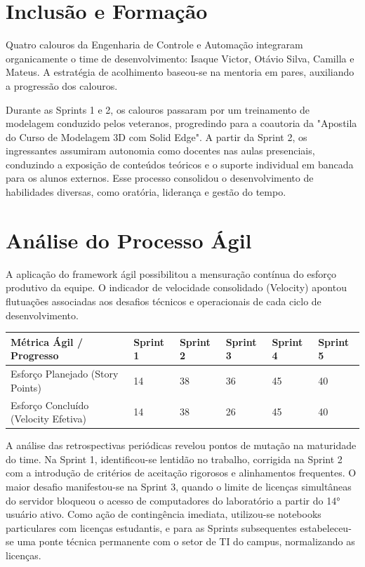 \documentclass[12pt,a4paper]{article}
\begin{document}
\section{Inclusão e Formação}
Quatro calouros da Engenharia de Controle e Automação integraram organicamente o time de desenvolvimento: Isaque Victor, Otávio Silva, Camilla e Mateus. A estratégia de acolhimento baseou-se na mentoria em pares, auxiliando a progressão dos calouros.

Durante as Sprints 1 e 2, os calouros passaram por um treinamento de modelagem conduzido pelos veteranos, progredindo para a coautoria da "Apostila do Curso de Modelagem 3D com Solid Edge". A partir da Sprint 2, os ingressantes assumiram autonomia como docentes nas aulas presenciais, conduzindo a exposição de conteúdos teóricos e o suporte individual em bancada para os alunos externos. Esse processo consolidou o desenvolvimento de habilidades diversas, como oratória, liderança e gestão do tempo.

\section{Análise do Processo Ágil}
A aplicação do framework ágil possibilitou a mensuração contínua do esforço produtivo da equipe. O indicador de velocidade consolidado (Velocity) apontou flutuações associadas aos desafios técnicos e operacionais de cada ciclo de desenvolvimento.

\begin{longtable}{|p{3.5cm}|p{1.9cm}|p{1.9cm}|p{1.9cm}|p{1.9cm}|p{1.9cm}|}
\toprule
Métrica Ágil / Progresso & Sprint 1 & Sprint 2 & Sprint 3 & Sprint 4 & Sprint 5 \\
\midrule
Esforço Planejado (Story Points) & 14 & 38 & 36 & 45 & 40 \\ \hline

Esforço Concluído (Velocity Efetiva) & 14 & 38 & 26 & 45 & 40 \\ \hline

\bottomrule
\end{longtable}

 A análise das retrospectivas periódicas revelou pontos de mutação na maturidade do time. Na Sprint 1, identificou-se lentidão no trabalho, corrigida na Sprint 2 com a introdução de critérios de aceitação rigorosos e alinhamentos frequentes. O maior desafio manifestou-se na Sprint 3, quando o limite de licenças simultâneas do servidor bloqueou o acesso de computadores do laboratório a partir do 14° usuário ativo. Como ação de contingência imediata, utilizou-se notebooks particulares com licenças estudantis, e para as Sprints subsequentes estabeleceu-se uma ponte técnica permanente com o setor de TI do campus, normalizando as licenças.
 
\end{document}
